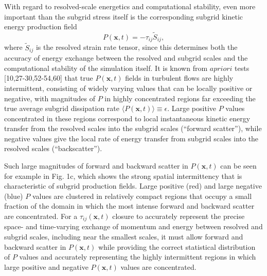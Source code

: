 With regard to resolved-scale energetics and computational stability, even more important than the subgrid stress itself is the corresponding subgrid kinetic energy production field 
%
\begin{equation}
	P(\mathbf{x},t) = -\tau_{ij}\widetilde{S}_{ij},
\end{equation}
%
%
where  $\widetilde{S}_{ij}$  is the resolved strain rate tensor, since this determines both the accuracy of energy exchange between the resolved and subgrid scales and the computational stability of the simulation itself. It is known from  $a priori$  tests [10,27-30,52-54,60] that true  $P(\mathbf{x},t)$  fields in turbulent flows are highly intermittent, consisting of widely varying values that can be locally positive or negative, with magnitudes of $P$ in highly concentrated regions far exceeding the true average subgrid dissipation rate  $\langle P(\mathbf{x},t)\rangle \equiv \epsilon$. Large positive $P$ values concentrated in these regions correspond to local instantaneous kinetic energy transfer from the resolved scales into the subgrid scales (“forward scatter”), while negative values give the local rate of energy transfer from subgrid scales into the resolved scales (“backscatter”). 

Such large magnitudes of forward and backward scatter in  $P(\mathbf{x},t)$  can be seen for example in Fig. 1c, which shows the strong spatial intermittency that is characteristic of subgrid production fields. Large positive (red) and large negative (blue) $P$ values are clustered in relatively compact regions that occupy a small fraction of the domain in which the most intense forward and backward scatter are concentrated. For a  $\tau_{ij}(\mathbf{x},t)$  closure to accurately represent the precise space- and time-varying exchange of momentum and energy between resolved and subgrid scales, including near the smallest scales, it must allow forward and backward scatter in  $P(\mathbf{x},t)$  while providing the correct statistical distribution of $P$ values and accurately representing the highly intermittent regions in which large positive and negative  $P(\mathbf{x},t)$  values are concentrated.

